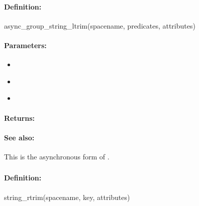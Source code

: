 \paragraph{Definition:}
\begin{rubycode}
async_group_string_ltrim(spacename, predicates, attributes)
\end{rubycode}

\paragraph{Parameters:}
\begin{itemize}[noitemsep]
\item {}\\

\item {}\\

\item {}\\

\end{itemize}

\paragraph{Returns:}


\paragraph{See also:}  This is the asynchronous form of .

\pagebreak
\subsubsection{}
\label{api:ruby:string_rtrim}


\paragraph{Definition:}
\begin{rubycode}
string_rtrim(spacename, key, attributes)
\end{rubycode}

